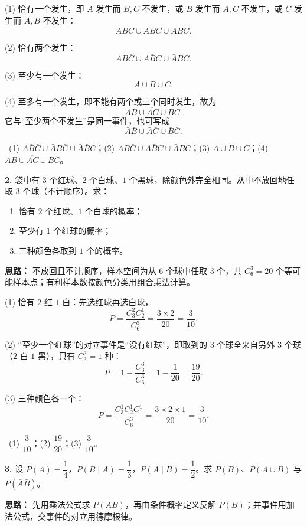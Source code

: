 (1) 恰有一个发生，即 $A$ 发生而 $B,C$ 不发生，或 $B$ 发生而 $A,C$ 不发生，或 $C$ 发生而 $A,B$ 不发生：
\[
A\bar B\bar C\cup \bar A B\bar C\cup \bar A\bar B C.
\]

(2) 恰有两个发生：
\[
AB\bar C\cup A\bar B C\cup \bar A BC.
\]

(3) 至少有一个发生：
\[
A\cup B\cup C.
\]

(4) 至多有一个发生，即不能有两个或三个同时发生，故为
\[
\overline{AB\cup AC\cup BC}.
\]
它与“至少两个不发生”是同一事件，也可写成
\[
\bar A\bar B\cup \bar A\bar C\cup \bar B\bar C.
\]

\ (1) $A\bar B\bar C\cup\bar A B\bar C\cup\bar A\bar B C$；(2) $AB\bar C\cup A\bar B C\cup\bar A BC$；(3) $A\cup B\cup C$；(4) $\overline{AB\cup AC\cup BC}$。

\else \answerarea[8] \fi%

\textbf{2.} 袋中有 $3$ 个红球、$2$ 个白球、$1$ 个黑球，除颜色外完全相同。从中不放回地任取 $3$ 个球（不计顺序）。求：
\begin{enumerate}[label=(\arabic*)]
    \item 恰有 $2$ 个红球、$1$ 个白球的概率；
    \item 至少有 $1$ 个红球的概率；
    \item 三种颜色各取到 $1$ 个的概率。
\end{enumerate}

\ifshowsolutions%
\textbf{思路：} 不放回且不计顺序，样本空间为从 $6$ 个球中任取 $3$ 个，共 $C_6^3=20$ 个等可能样本点；有利样本数按颜色分类用组合乘法计算。

(1) 恰有 $2$ 红 $1$ 白：先选红球再选白球，
\[
P=\frac{C_3^2C_2^1}{C_6^3}=\frac{3\times 2}{20}=\frac{3}{10}.
\]

(2) “至少一个红球”的对立事件是“没有红球”，即取到的 $3$ 个球全来自另外 $3$ 个球（$2$ 白 $1$ 黑），只有 $C_3^3=1$ 种：
\[
P=1-\frac{C_3^3}{C_6^3}=1-\frac{1}{20}=\frac{19}{20}.
\]

(3) 三种颜色各一个：
\[
P=\frac{C_3^1C_2^1C_1^1}{C_6^3}=\frac{3\times 2\times 1}{20}=\frac{3}{10}.
\]

\ (1) $\dfrac{3}{10}$；(2) $\dfrac{19}{20}$；(3) $\dfrac{3}{10}$。

\else \answerarea[8] \fi%

\textbf{3.} 设 $P(A)=\dfrac14$，$P(B\mid A)=\dfrac13$，$P(A\mid B)=\dfrac12$。求 $P(B)$、$P(A\cup B)$ 与 $P(\bar A\bar B)$。

\ifshowsolutions%
\textbf{思路：} 先用乘法公式求 $P(AB)$，再由条件概率定义反解 $P(B)$；并事件用加法公式，交事件的对立用德摩根律。

